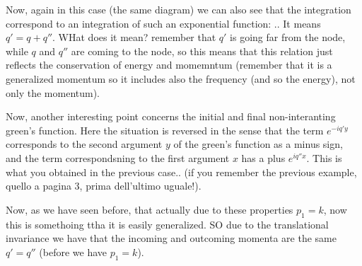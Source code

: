 \documentclass[../main/main.tex]{subfiles}
\begin{document}
Now, again in this case (the same diagram) we can also see that the integration correspond to an integration of such an exponential function:
..
It means \( q'=q+q'' \). WHat does it mean? remember that \( q' \) is going far from the node, while \( q  \) and \( q'' \) are coming to the node, so this means that this relation just reflects the conservation of energy and momemntum (remember that it is a generalized momentum so it includes also the frequency (and so the energy), not only the momentum).

Now, another interesting point concerns the initial and final non-interanting green's function. Here the situation is reversed in the sense that the term \( e^{-iq' y}  \) corresponds to the second argument \( y  \) of the green's function as a minus sign, and the term correspondsning to the first argument \( x \) has a plus \( e^{iq''x}  \). This is what you obtained in the previous case.. (if you remember the previous example, quello a pagina 3, prima dell'ultimo uguale!).

Now, as we have seen before, that actually due to these properties \( p_1=k \), now this is somethoing ttha it is easily generalized. SO due to the translational invariance we have that the incoming and outcoming momenta are the same \( q'=q'' \) (before we have \( p_1=k \)).
\end{document}
